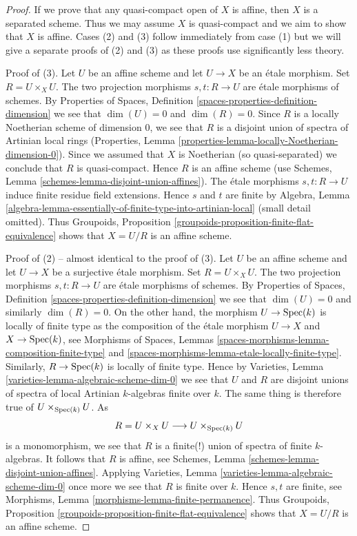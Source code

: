 \begin{proof}
If we prove that any quasi-compact open of $X$ is affine, then
$X$ is a separated scheme. Thus we may assume $X$ is quasi-compact
and we aim to show that $X$ is affine.
Cases (2) and (3) follow immediately from case (1) but we will give a separate
proofs of (2) and (3) as these proofs use significantly less theory.

\medskip\noindent
Proof of (3). Let $U$ be an affine scheme and let $U \to X$ be an
\'etale morphism. Set $R = U \times_X U$. The two projection
morphisms $s, t : R \to U$ are \'etale morphisms of schemes. By
Properties of Spaces, Definition \ref{spaces-properties-definition-dimension}
we see that $\dim(U) = 0$ and $\dim(R) = 0$.
Since $R$ is a locally Noetherian scheme of dimension $0$,
we see that $R$ is a disjoint union of spectra of
Artinian local rings
(Properties, Lemma \ref{properties-lemma-locally-Noetherian-dimension-0}).
Since we assumed that $X$ is Noetherian (so quasi-separated) we
conclude that $R$ is quasi-compact. Hence $R$ is an affine scheme
(use Schemes, Lemma \ref{schemes-lemma-disjoint-union-affines}).
The \'etale morphisms $s, t : R \to U$ induce finite residue field
extensions. Hence $s$ and $t$ are finite by
Algebra, Lemma
\ref{algebra-lemma-essentially-of-finite-type-into-artinian-local}
(small detail omitted). 
Thus
Groupoids, Proposition \ref{groupoids-proposition-finite-flat-equivalence}
shows that $X = U/R$ is an affine scheme.

\medskip\noindent
Proof of (2) -- almost identical to the proof of (3).
Let $U$ be an affine scheme and let $U \to X$ be a surjective \'etale morphism.
Set $R = U \times_X U$. The two projection morphisms
$s, t : R \to U$ are \'etale morphisms of schemes. By
Properties of Spaces, Definition \ref{spaces-properties-definition-dimension}
we see that $\dim(U) = 0$ and similarly $\dim(R) = 0$.
On the other hand, the morphism $U \to \mathop{\mathrm{Spec}}(k)$ is locally of finite
type as the composition of the \'etale morphism $U \to X$ and
$X \to \mathop{\mathrm{Spec}}(k)$, see
Morphisms of Spaces,
Lemmas \ref{spaces-morphisms-lemma-composition-finite-type} and
\ref{spaces-morphisms-lemma-etale-locally-finite-type}.
Similarly, $R \to \mathop{\mathrm{Spec}}(k)$ is locally of finite type.
Hence by
Varieties, Lemma \ref{varieties-lemma-algebraic-scheme-dim-0}
we see that $U$ and $R$ are disjoint unions of spectra of
local Artinian $k$-algebras finite over $k$. The same thing
is therefore true of $U \times_{\mathop{\mathrm{Spec}}(k)} U$. As
$$
R = U \times_X U \longrightarrow U \times_{\mathop{\mathrm{Spec}}(k)} U
$$
is a monomorphism, we see that $R$ is a finite(!) union of spectra of
finite $k$-algebras. It follows that $R$ is affine, see
Schemes, Lemma \ref{schemes-lemma-disjoint-union-affines}.
Applying
Varieties, Lemma \ref{varieties-lemma-algebraic-scheme-dim-0}
once more we see that $R$ is finite over $k$. Hence $s, t$
are finite, see
Morphisms, Lemma \ref{morphisms-lemma-finite-permanence}.
Thus
Groupoids, Proposition \ref{groupoids-proposition-finite-flat-equivalence}
shows that $X = U/R$ is an affine scheme.


\end{proof}

